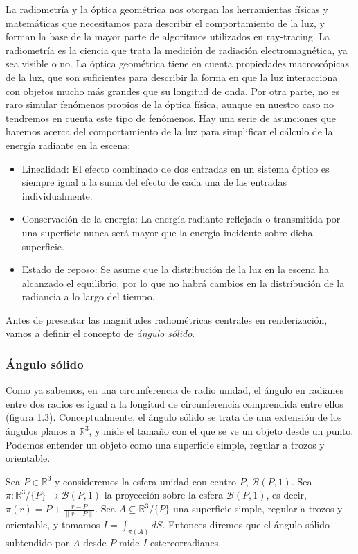 La radiometría y la óptica geométrica nos otorgan las herramientas físicas y matemáticas que necesitamos para describir el comportamiento de la luz, y forman la base de la mayor parte de algoritmos utilizados en ray-tracing. La radiometría es la ciencia que trata la medición de radiación electromagnética, ya sea visible o no. La óptica geométrica tiene en cuenta propiedades macroscópicas de la luz, que son suficientes para describir la forma en que la luz interacciona con objetos mucho más grandes que su longitud de onda. Por otra parte, no es raro simular fenómenos propios de la óptica física, aunque en nuestro caso no tendremos en cuenta este tipo de fenómenos. Hay una serie de asunciones que haremos acerca del comportamiento de la luz para simplificar el cálculo de la energía radiante en la escena:

\begin{itemize}
\item Linealidad: El efecto combinado de dos entradas en un sistema óptico es siempre igual a la suma del efecto de cada una de las entradas individualmente.
\item Conservación de la energía: La energía radiante reflejada o transmitida por una superficie nunca será mayor que la energía incidente sobre dicha superficie.
  \item Estado de reposo: Se asume que la distribución de la luz en la escena ha alcanzado el equilibrio, por lo que no habrá cambios en la distribución de la radiancia a lo largo del tiempo.
\end{itemize}

Antes de presentar las magnitudes radiométricas centrales en renderización, vamos a definir el concepto de \emph{ángulo sólido}.

\subsubsection*{Ángulo sólido}

Como ya sabemos, en una circunferencia de radio unidad, el ángulo en radianes entre dos radios es igual a la longitud de circunferencia comprendida entre ellos (figura 1.3). Conceptualmente, el ángulo sólido se trata de una extensión de los ángulos planos a $\mathds{R}^3$, y mide el tamaño con el que se ve un objeto desde un punto. Podemos entender un objeto como una superficie simple, regular a trozos y orientable.

\begin{definicion}
    Sea $P \in \mathds{R}^3$ y consideremos la esfera unidad con centro $P$, $\mathcal{B}(P,1)$. Sea $\pi :\mathds{R}^3/\{P\}\rightarrow \mathcal{B}(P,1)$ la proyección sobre la esfera $\mathcal{B}(P,1)$, es decir, $\pi(r) = P + \frac{r-P}{\|r-P\|}$. Sea $A \subseteq \mathds{R}^3/\{P\}$ una superficie simple, regular a trozos y orientable, y tomamos $I = \int _{\pi(A)} dS$. Entonces diremos que el ángulo sólido subtendido por $A$ desde $P$ mide $I$ estereorradianes.
\end{definicion}

